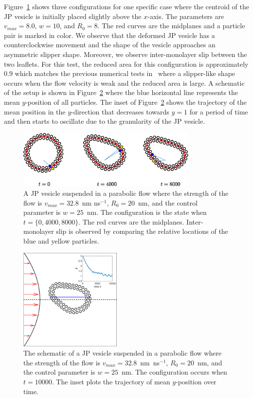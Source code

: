 \documentclass[lineno]{jfm}
\begin{document}
Figure~\ref{figure6} shows three configurations for one specific case
where the centroid of the JP vesicle is initially placed slightly
above the $x$-axis. The parameters are $v_{max} = 8.0$, $w=10$, and
$R_0=8$. The red curves are the midplanes and a particle pair is marked
in color. We observe that the deformed JP vesicle has a
counterclockwise movement and the shape of the vesicle approaches an
asymmetric slipper shape. Moreover, we observe inter-monolayer slip
between the two leaflets. For this test, the reduced area for this
configuration is approximately $0.9$ which matches the previous
numerical tests in~\cite{Kaoui09} where a slipper-like shape occurs when
the flow velocity is weak and the reduced area is large. A schematic of
the setup is shown in Figure~\ref{figure7} where the blue horizontal
line represents the mean $y$-position of all particles. The inset of
Figure~\ref{figure7} shows the trajectory of the mean position in the
$y$-direction that decreases towards $y=1$ for a period of time and then
starts to oscillate due to the granularity of the JP vesicle. 

\begin{figure}
\centering
\includegraphics[width=0.8\textwidth]{slipper.eps}
  \caption{\label{figure6} A JP vesicle suspended in a parabolic flow
  where the strength of the flow is $v_{max}=32.8$~nm ns$^{-1}$, $R_0 =
  20$~nm, and the control parameter is $w=25$~nm. The configuration is
  the state when $t=\{0, 4000, 8000\}$. The red curves are the
  midplanes. Inter-monolayer slip is observed by comparing the relative
  locations of the blue and yellow particles.}
\end{figure}


\begin{figure}
\centering
\includegraphics[height=2in]{parabolic.eps}
  \caption{\label{figure7} The schematic of a JP vesicle suspended in a
  parabolic flow where the strength of the flow is
  $v_{max}=32.8$~nm~ns$^{-1}$, $R_0 = 20$~nm, and the control parameter
  is $w=25$~nm. The configuration occurs when $t=10000$. The inset plots
  the trajectory of mean $y$-position over time.}
\end{figure}
\end{document}
